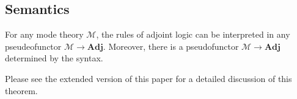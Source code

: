 \documentclass{drl-common/llncs}
\newcommand{\M}{\ensuremath{\mathcal{M}}}
\newcommand{\Adj}{\textbf{Adj}}
\renewcommand\wftp[2]{\ensuremath{#1 \,\,\, \dsd{type}_{#2}}}
\newcommand\seq[3]{\ensuremath{#1 \, [ #2 ] \, \vdash \, #3}}
\newcommand\ident[1]{\ensuremath{\dsd{ident}_{#1}}}
\newcommand\cutsym{\ensuremath{\dsd{cut}}}
\newcommand\cut[2]{\ensuremath{{\cutsym \,\, #1 \,\, #2}}}
\newcommand\cuti{\ensuremath{\bullet}}
\newcommand\ap[2]{\ensuremath{#1 \approx #2}}
\newcommand\iso{\cong}
\begin{document}
\subsection{Semantics}

\begin{theorem}
For any mode theory \M, the rules of adjoint logic can be interpreted in
any pseudeofunctor $\M \to \Adj$.  Moreover, there is a pseudofunctor
$\M \to \Adj$ determined by the syntax.  
\end{theorem}
Please see the extended version of this paper for a detailed discussion
of this theorem.



\end{document}
